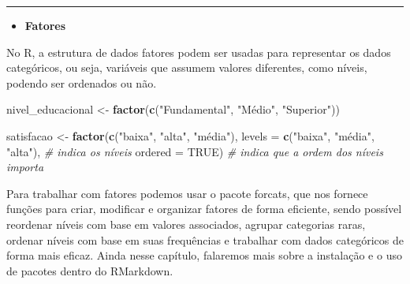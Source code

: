 \documentclass[
]{book}
\newenvironment{Shaded}{\begin{snugshade}}{\end{snugshade}}
\newcommand{\AttributeTok}[1]{\textcolor[rgb]{0.13,0.29,0.53}{#1}}
\newcommand{\CommentTok}[1]{\textcolor[rgb]{0.56,0.35,0.01}{\textit{#1}}}
\newcommand{\ConstantTok}[1]{\textcolor[rgb]{0.56,0.35,0.01}{#1}}
\newcommand{\DecValTok}[1]{\textcolor[rgb]{0.00,0.00,0.81}{#1}}
\newcommand{\FunctionTok}[1]{\textcolor[rgb]{0.13,0.29,0.53}{\textbf{#1}}}
\newcommand{\NormalTok}[1]{#1}
\newcommand{\OtherTok}[1]{\textcolor[rgb]{0.56,0.35,0.01}{#1}}
\newcommand{\SpecialCharTok}[1]{\textcolor[rgb]{0.81,0.36,0.00}{\textbf{#1}}}
\newcommand{\StringTok}[1]{\textcolor[rgb]{0.31,0.60,0.02}{#1}}
\providecommand{\tightlist}{%
  \setlength{\itemsep}{0pt}\setlength{\parskip}{0pt}}
\begin{document}
\begin{Shaded}
\end{Shaded}

\begin{center}\rule{0.5\linewidth}{0.5pt}\end{center}

\begin{itemize}
\tightlist
\item
  \textbf{Fatores}
\end{itemize}

No R, a estrutura de dados fatores podem ser usadas para representar os dados categóricos, ou seja, variáveis que assumem valores diferentes, como níveis, podendo ser ordenados ou não.

\begin{Shaded}
\begin{Highlighting}[]
\NormalTok{nivel\_educacional }\OtherTok{\textless{}{-}} \FunctionTok{factor}\NormalTok{(}\FunctionTok{c}\NormalTok{(}\StringTok{"Fundamental"}\NormalTok{, }\StringTok{"Médio"}\NormalTok{, }\StringTok{"Superior"}\NormalTok{))}

\NormalTok{satisfacao }\OtherTok{\textless{}{-}} \FunctionTok{factor}\NormalTok{(}\FunctionTok{c}\NormalTok{(}\StringTok{"baixa"}\NormalTok{, }\StringTok{"alta"}\NormalTok{, }\StringTok{"média"}\NormalTok{),}
              \AttributeTok{levels =} \FunctionTok{c}\NormalTok{(}\StringTok{"baixa"}\NormalTok{, }\StringTok{"média"}\NormalTok{, }\StringTok{"alta"}\NormalTok{), }\CommentTok{\# indica os níveis}
              \AttributeTok{ordered =} \ConstantTok{TRUE}\NormalTok{) }\CommentTok{\# indica que a ordem dos níveis importa}
\end{Highlighting}
\end{Shaded}

Para trabalhar com fatores podemos usar o pacote forcats, que nos fornece funções para criar, modificar e organizar fatores de forma eficiente, sendo possível reordenar níveis com base em valores associados, agrupar categorias raras, ordenar níveis com base em suas frequências e trabalhar com dados categóricos de forma mais eficaz. Ainda nesse capítulo, falaremos mais sobre a instalação e o uso de pacotes dentro do RMarkdown.
\end{document}
